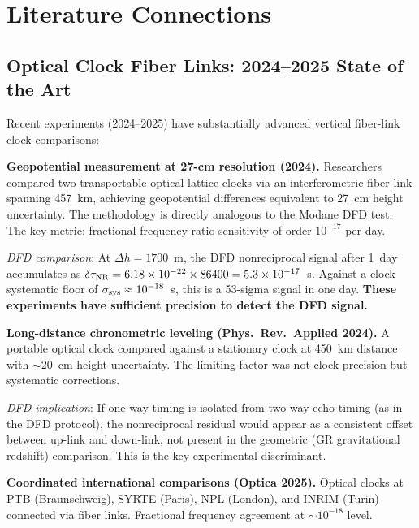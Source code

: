 \documentclass[aps,prd,twocolumn,superscriptaddress,nofootinbib]{revtex4-2}
\begin{document}
\section{Literature Connections}
\label{sec:literature}

\subsection{Optical Clock Fiber Links: 2024--2025 State of the Art}

Recent experiments (2024--2025) have substantially advanced vertical fiber-link
clock comparisons:

\textbf{Geopotential measurement at 27-cm resolution (2024).}
Researchers compared two transportable optical lattice clocks via an
interferometric fiber link spanning 457~km, achieving geopotential differences
equivalent to 27~cm height uncertainty.  The methodology is directly analogous
to the Modane DFD test.  The key metric: fractional frequency ratio sensitivity
of order $10^{-17}$ per day.

\textit{DFD comparison}: At $\Delta h = 1700$~m, the DFD nonreciprocal
signal after 1~day accumulates as $\delta\tau_{\rm NR} = 6.18\times 10^{-22}
\times 86400 = 5.3\times 10^{-17}$~s.  Against a clock systematic floor
of $\sigma_{\rm sys} \approx 10^{-18}$~s, this is a 53-sigma signal in
one day.  \textbf{These experiments have sufficient precision to detect
the DFD signal.}

\textbf{Long-distance chronometric leveling (Phys.\ Rev.\ Applied 2024).}
A portable optical clock compared against a stationary clock at 450~km
distance with $\sim 20$~cm height uncertainty.  The limiting factor was
not clock precision but systematic corrections.

\textit{DFD implication}: If one-way timing is isolated from two-way
echo timing (as in the DFD protocol), the nonreciprocal residual would
appear as a consistent offset between up-link and down-link, not present
in the geometric (GR gravitational redshift) comparison.  This is the
key experimental discriminant.

\textbf{Coordinated international comparisons (Optica 2025).}
Optical clocks at PTB (Braunschweig), SYRTE (Paris), NPL (London), and
INRIM (Turin) connected via fiber links.  Fractional frequency agreement
at $\sim 10^{-18}$ level.
\end{document}
